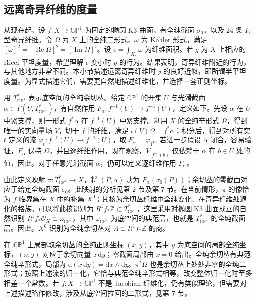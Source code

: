 \subsection{远离奇异纤维的度量}\label{sec:7.3.3}

从现在起，设 $f\colon X\to\mathbb{CP}^1$ 为固定的椭圆 K3 曲面，有全纯截面 $\sigma_0$，以及 24 条 $I_1$ 型奇异纤维。令 $\Omega$ 为 $X$ 上的全纯二形式，$\omega$ 为 Kähler 形式，满足 $[\omega]^2=[\operatorname{Re}\Omega]^2=[\operatorname{Im}\Omega]^2$。设 $\epsilon=\int_{X_b}\omega$ 为纤维面积。若 $g$ 为 $X$ 上相应的 Ricci 平坦度量，希望理解 $\epsilon$ 变小时 $g$ 的行为。结果表明，奇异纤维附近的行为，与其他地方非常不同。本小节描述远离奇异纤维时 $g$ 的良好近似，即所谓半平坦度量。为显式描述它们，需要更自然地描述纤维化，并选择一套正则坐标。

用 $T^*_{\mathbb{CP}^1}$ 表示底空间的全纯余切丛。给定 $\mathbb{CP}^1$ 的开集 $U$ 与光滑截面 $\alpha\in\Gamma(U,T^*_{\mathbb{CP}^1})$，有自然作用 $F_\alpha\colon f^{-1}(U)\to f^{-1}(U)$，定义如下。先设 $\alpha$ 在 $U$ 中紧支撑，则一形式 $f^*\alpha$ 在 $f^{-1}(U)$ 中紧支撑。利用 $X$ 的全纯辛形式 $\Omega$，得到唯一的实向量场 $V$，切于 $f$ 的纤维，满足 $\iota(V)\Omega=f^*\alpha$；积分后，得到对所有实 $t$ 定义的流 $\varphi_t\colon f^{-1}(U)\to f^{-1}(U)$。取 $F_\alpha=\varphi_1$。若进一步假设 $\alpha$ 闭合，容易验证，$F_\alpha$ 保持 $\Omega$，并且逐纤维作用。现在观察，$V|_{f^{-1}(b)}$ 仅依赖于 $\alpha$ 在 $b\in U$ 处的值，因此，对于任意光滑截面 $\alpha$，仍可以定义逐纤维作用 $F_\alpha$。

由此定义映射 $\pi\colon T^*_{\mathbb{CP}^1}\to X$，将 $(P,\alpha)$ 映为 $F_\alpha(\sigma_0(P))$；余切丛的零截面对应于给定全纯截面 $\sigma_0$。此映射的分析见第 2 节及第 7 节。在当前情形，$\pi$ 的像恰为 $f$ 临界集在 $X$ 中的补集 $X^0$；其核为余切丛纤维中全纯变化、在奇异纤维处退化的格族。可以将此核识别为 $R^1f_*\mathbb Z\subset T^*_{\mathbb{CP}^1}$，这里采用对椭圆 K3 曲面成立的自然识别 $R^1f_*\mathcal O_X\cong\omega_{\mathbb{CP}^1}$，其中 $\omega_{\mathbb{CP}^1}$ 为底空间的典范层，也就是 $T^*_{\mathbb{CP}^1}$ 的全纯截面层。因此，$X^0$ 识别为全纯余切丛对 $\Lambda\cong R^1f_*\mathbb Z$ 的商。

在 $\mathbb{CP}^1$ 上局部取余切丛的全纯正则坐标 $(x,y)$，其中 $y$ 为底空间的局部全纯坐标，$(x,y)$ 对应于余切向量 $x\,\mathrm dy$；零截面局部由 $x=0$ 给出。全纯余切丛有典范全纯辛形式，局部为 $\mathrm d(x\,\mathrm dy)=\mathrm dx\wedge\mathrm dy$。$\pi^*\Omega$ 也是余切丛上处处非零的全纯二形式；按照上述流的归一化，它恰与典范全纯辛形式相等，改变整体归一化时至多相差一个常数。若 $f\colon X\to\mathbb{CP}^1$ 不是 Jacobian 纤维化，仍有类似理论，但需要对上述描述略作修改，涉及从底空间拉回的二形式，见第 7 节。

